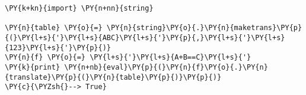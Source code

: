 \begin{Verbatim}[commandchars=\\\{\}]
\PY{k+kn}{import} \PY{n+nn}{string}

\PY{n}{table} \PY{o}{=} \PY{n}{string}\PY{o}{.}\PY{n}{maketrans}\PY{p}{(}\PY{l+s}{'}\PY{l+s}{ABC}\PY{l+s}{'}\PY{p}{,}\PY{l+s}{'}\PY{l+s}{123}\PY{l+s}{'}\PY{p}{)}
\PY{n}{f} \PY{o}{=} \PY{l+s}{'}\PY{l+s}{A+B==C}\PY{l+s}{'}
\PY{k}{print} \PY{n+nb}{eval}\PY{p}{(}\PY{n}{f}\PY{o}{.}\PY{n}{translate}\PY{p}{(}\PY{n}{table}\PY{p}{)}\PY{p}{)}
\PY{c}{\PYZsh{}--> True}
\end{Verbatim}
